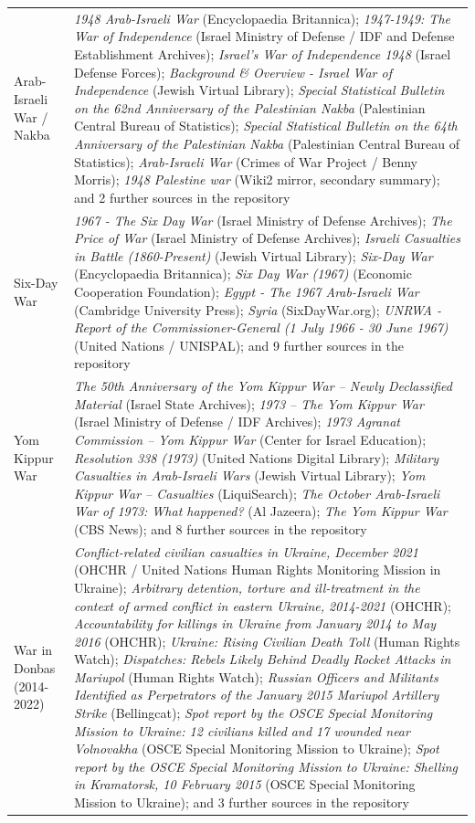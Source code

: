 \documentclass[11pt]{article}
\begin{document}
\begin{scriptsize}
\begin{longtable}{p{3.5cm} p{12.5cm}}
\addlinespace
1948 Arab-Israeli War / Nakba & \emph{1948 Arab-Israeli War} (Encyclopaedia Britannica); \emph{1947-1949: The War of Independence} (Israel Ministry of Defense / IDF and Defense Establishment Archives); \emph{Israel's War of Independence 1948} (Israel Defense Forces); \emph{Background \& Overview - Israel War of Independence} (Jewish Virtual Library); \emph{Special Statistical Bulletin on the 62nd Anniversary of the Palestinian Nakba} (Palestinian Central Bureau of Statistics); \emph{Special Statistical Bulletin on the 64th Anniversary of the Palestinian Nakba} (Palestinian Central Bureau of Statistics); \emph{Arab-Israeli War} (Crimes of War Project / Benny Morris); \emph{1948 Palestine war} (Wiki2 mirror, secondary summary); and 2 further sources in the repository \\
\addlinespace
Six-Day War & \emph{1967 - The Six Day War} (Israel Ministry of Defense Archives); \emph{The Price of War} (Israel Ministry of Defense Archives); \emph{Israeli Casualties in Battle (1860-Present)} (Jewish Virtual Library); \emph{Six-Day War} (Encyclopaedia Britannica); \emph{Six Day War (1967)} (Economic Cooperation Foundation); \emph{Egypt - The 1967 Arab-Israeli War} (Cambridge University Press); \emph{Syria} (SixDayWar.org); \emph{UNRWA - Report of the Commissioner-General (1 July 1966 - 30 June 1967)} (United Nations / UNISPAL); and 9 further sources in the repository \\
\addlinespace
Yom Kippur War & \emph{The 50th Anniversary of the Yom Kippur War – Newly Declassified Material} (Israel State Archives); \emph{1973 – The Yom Kippur War} (Israel Ministry of Defense / IDF Archives); \emph{1973 Agranat Commission – Yom Kippur War} (Center for Israel Education); \emph{Resolution 338 (1973)} (United Nations Digital Library); \emph{Military Casualties in Arab-Israeli Wars} (Jewish Virtual Library); \emph{Yom Kippur War – Casualties} (LiquiSearch); \emph{The October Arab-Israeli War of 1973: What happened?} (Al Jazeera); \emph{The Yom Kippur War} (CBS News); and 8 further sources in the repository \\
\addlinespace
War in Donbas (2014-2022) & \emph{Conflict-related civilian casualties in Ukraine, December 2021} (OHCHR / United Nations Human Rights Monitoring Mission in Ukraine); \emph{Arbitrary detention, torture and ill-treatment in the context of armed conflict in eastern Ukraine, 2014-2021} (OHCHR); \emph{Accountability for killings in Ukraine from January 2014 to May 2016} (OHCHR); \emph{Ukraine: Rising Civilian Death Toll} (Human Rights Watch); \emph{Dispatches: Rebels Likely Behind Deadly Rocket Attacks in Mariupol} (Human Rights Watch); \emph{Russian Officers and Militants Identified as Perpetrators of the January 2015 Mariupol Artillery Strike} (Bellingcat); \emph{Spot report by the OSCE Special Monitoring Mission to Ukraine: 12 civilians killed and 17 wounded near Volnovakha} (OSCE Special Monitoring Mission to Ukraine); \emph{Spot report by the OSCE Special Monitoring Mission to Ukraine: Shelling in Kramatorsk, 10 February 2015} (OSCE Special Monitoring Mission to Ukraine); and 3 further sources in the repository \\

\end{longtable}
\end{scriptsize}
\end{document}

